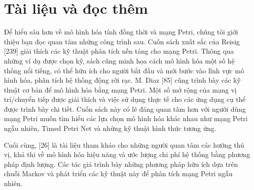 \clearpage

\section{Tài liệu và đọc thêm}
Để hiểu sâu hơn về mô hình hóa tính đồng thời và mạng Petri, chúng tôi giới thiệu bạn đọc quan tâm những công trình sau. Cuốn sách xuất sắc của Reisig [239] giải thích các kỹ thuật phân tích nền tảng cho mạng Petri. Thông qua những ví dụ được chọn kỹ, sách cũng minh họa cách mô hình hóa một số hệ thống nổi tiếng, có thể hữu ích cho người bắt đầu và mới bước vào lĩnh vực mô hình hóa, phân tích hệ thống động rời rạc. M. Diaz [85] cũng
trình bày các kỹ thuật cơ bản để mô hình hóa bằng mạng Petri. Một số mở rộng của mạng vị trí/chuyển tiếp được giải thích và việc sử dụng thực tế cho các ứng dụng cụ thể được trình bày chi tiết. Cuốn sách này có lẽ đáng quan tâm hơn với người dùng mạng Petri muốn tìm hiểu các lựa chọn mô hình hóa khác nhau như mạng Petri ngẫu nhiên, Timed Petri Net và những kỹ thuật hình thức tương ứng.

Cuối cùng, [26] là tài liệu tham khảo cho những người quan tâm các hướng thú vị, khả thi về mô hình hóa hiệu năng và ước lượng chi phí hệ thống bằng phương pháp định lượng. Các tác giả trình bày những phương pháp hữu ích dựa trên chuỗi Markov và phát triển các kỹ thuật này để phân tích mạng Petri ngẫu nhiên.

